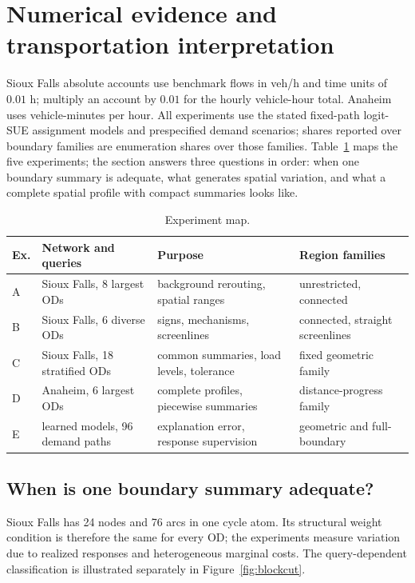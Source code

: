 \section{Numerical evidence and transportation interpretation}\label{sec:numerics}
Sioux Falls absolute accounts use benchmark flows in veh/h and time units of $0.01$ h; multiply an account by $0.01$ for the hourly vehicle-hour total. Anaheim uses vehicle-minutes per hour. All experiments use the stated fixed-path logit-SUE assignment models and prespecified demand scenarios; shares reported over boundary families are enumeration shares over those families. Table~\ref{tab:experimentmap} maps the five experiments; the section answers three questions in order: when one boundary summary is adequate, what generates spatial variation, and what a complete spatial profile with compact summaries looks like.
\begin{table}[pos=tb]
\caption{Experiment map.}\label{tab:experimentmap}
\begin{tabular*}{\tblwidth}{@{\extracolsep{\fill}}llll}
\toprule
Ex. & Network and queries & Purpose & Region families\\
\midrule
A & Sioux Falls, 8 largest ODs & background rerouting, spatial ranges & unrestricted, connected\\
B & Sioux Falls, 6 diverse ODs & signs, mechanisms, screenlines & connected, straight screenlines\\
C & Sioux Falls, 18 stratified ODs & common summaries, load levels, tolerance & fixed geometric family\\
D & Anaheim, 6 largest ODs & complete profiles, piecewise summaries & distance-progress family\\
E & learned models, 96 demand paths & explanation error, response supervision & geometric and full-boundary\\
\bottomrule\end{tabular*}\end{table}

\subsection{When is one boundary summary adequate?}\label{sec:adequate}
Sioux Falls has 24 nodes and 76 arcs in one cycle atom. Its structural weight condition is therefore the same for every OD; the experiments measure variation due to realized responses and heterogeneous marginal costs. The query-dependent classification is illustrated separately in Figure~\ref{fig:blockcut}.

